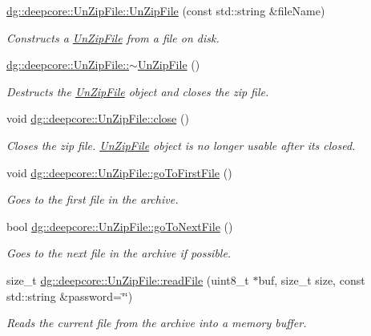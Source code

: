 \begin{DoxyCompactItemize}
\hyperlink{group___utility_module_ga4418028e98c6031359ace40625987864}{dg\+::deepcore\+::\+Un\+Zip\+File\+::\+Un\+Zip\+File} (const std\+::string \&file\+Name)
\begin{DoxyCompactList}\small\item\em Constructs a \hyperlink{classdg_1_1deepcore_1_1_un_zip_file}{Un\+Zip\+File} from a file on disk. \end{DoxyCompactList}\item 
\hyperlink{group___utility_module_ga325131b751ccc5a391367afb09084036}{dg\+::deepcore\+::\+Un\+Zip\+File\+::$\sim$\+Un\+Zip\+File} ()
\begin{DoxyCompactList}\small\item\em Destructs the \hyperlink{classdg_1_1deepcore_1_1_un_zip_file}{Un\+Zip\+File} object and closes the zip file. \end{DoxyCompactList}\item 
void \hyperlink{group___utility_module_ga6f28d71dffa80123aaa68ebf44783d0c}{dg\+::deepcore\+::\+Un\+Zip\+File\+::close} ()
\begin{DoxyCompactList}\small\item\em Closes the zip file. \hyperlink{classdg_1_1deepcore_1_1_un_zip_file}{Un\+Zip\+File} object is no longer usable after it\textquotesingle{}s closed. \end{DoxyCompactList}\item 
void \hyperlink{group___utility_module_ga065f405804b43cb3fdabca1fe7bd095a}{dg\+::deepcore\+::\+Un\+Zip\+File\+::go\+To\+First\+File} ()
\begin{DoxyCompactList}\small\item\em Goes to the first file in the archive. \end{DoxyCompactList}\item 
bool \hyperlink{group___utility_module_ga88b7a33f99cbcc1748da060b7233cb9a}{dg\+::deepcore\+::\+Un\+Zip\+File\+::go\+To\+Next\+File} ()
\begin{DoxyCompactList}\small\item\em Goes to the next file in the archive if possible. \end{DoxyCompactList}\item 
size\+\_\+t \hyperlink{group___utility_module_ga16985655d6b3bf1f05330d54ca736b0e}{dg\+::deepcore\+::\+Un\+Zip\+File\+::read\+File} (uint8\+\_\+t $\ast$buf, size\+\_\+t size, const std\+::string \&password=\char`\"{}\char`\"{})
\begin{DoxyCompactList}\small\item\em Reads the current file from the archive into a memory buffer. \end{DoxyCompactList}\item 

\end{DoxyCompactItemize}
